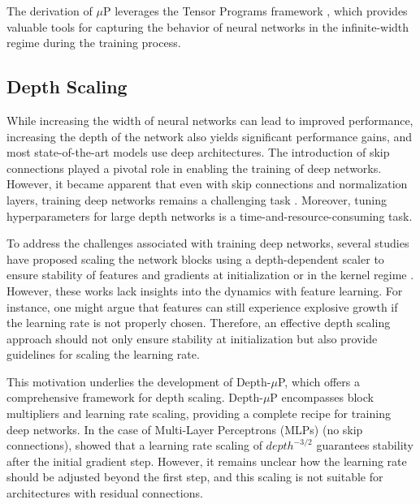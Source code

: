 The derivation of $\mu$P leverages the Tensor Programs framework \citep{yang2021tensor_i, yang2020scaling, yang2020tensor, yang2021tensor, yang2022tensor}, which provides valuable tools for capturing the behavior of neural networks in the infinite-width regime during the training process. 

\subsection{Depth Scaling} 
While increasing the width of neural networks can lead to improved performance, increasing the depth of the network also yields significant performance gains, and most state-of-the-art models use deep architectures. The introduction of skip connections \citep{he2016deep, he2016identity} played a pivotal role in enabling the training of deep networks. However, it became apparent that even with skip connections and normalization layers, training deep networks remains a challenging task \citep{liu2020understanding}. Moreover, tuning hyperparameters for large depth networks is a time-and-resource-consuming task.

To address the challenges associated with training deep networks, several studies have proposed scaling the network blocks using a depth-dependent scaler to ensure stability of features and gradients at initialization or in the kernel regime \citep{hayou21stable, hanin2018start, zhang2019fixup, noci2022signal, hayou2023infinitedepth, hayou2023width, noci2023shaped,zhang2023stabilize}. However, these works lack insights into the dynamics with feature learning. For instance, one might argue that features can still experience explosive growth if the learning rate is not properly chosen. Therefore, an effective depth scaling approach should not only ensure stability at initialization but also provide guidelines for scaling the learning rate.

This motivation underlies the development of Depth-$\mu$P, which offers a comprehensive framework for depth scaling. Depth-$\mu$P encompasses block multipliers and learning rate scaling, providing a complete recipe for training deep networks. In the case of Multi-Layer Perceptrons (MLPs) (no skip connections), \citet{jelassi2023depth} showed that a learning rate scaling of $depth^{-3/2}$ guarantees stability after the initial gradient step. However, it remains unclear how the learning rate should be adjusted beyond the first step, and this scaling is not suitable for architectures with residual connections.

